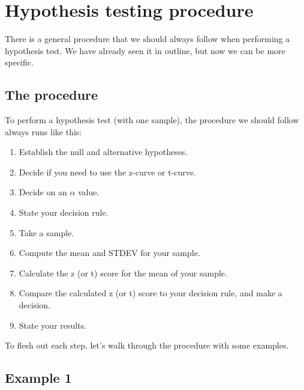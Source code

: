 \documentclass[../../../main.tex]{subfiles}
\begin{document}
\chapter{Hypothesis testing procedure}

There is a general procedure that we should always follow when performing a hypothesis test. We have already seen it in outline, but now we can be more specific. 


\section{The procedure}

To perform a hypothesis test (with one sample), the procedure we should follow always runs like this: 

\begin{enumerate}

  \item Establish the null and alternative hypotheses. 
  \item Decide if you need to use the z-curve or t-curve.
  \item Decide on an $\alpha$ value.
  \item State your decision rule.
  \item Take a sample.
  \item Compute the mean and STDEV for your sample.
  \item Calculate the z (or t) score for the mean of your sample.
  \item Compare the calculated z (or t) score to your decision rule, and make a decision.
  \item State your results.

\end{enumerate}

\noindent
To flesh out each step, let's walk through the procedure with some examples.


\section{Example 1}
\end{document}
